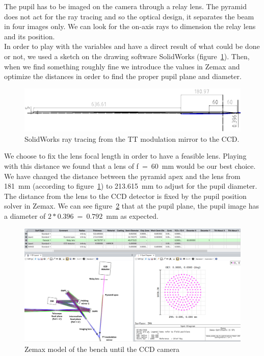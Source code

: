 \documentclass[12pt,a4paper]{article}
\begin{document}
The pupil has to be imaged on the camera through a relay lens. The pyramid does not act for the ray tracing and so the optical design, it separates the beam in four images only. We can look for the on-axis rays to dimension the relay lens and its position.\\
In order to play with the variables and have a direct result of what could be done or not, we used a sketch on the drawing software SolidWorks (figure~\ref{fig:SW_trace_rayons_TTMM_CCD}). Then, when we find something roughly fine we introduce the values in Zemax and optimize the distances in order to find the proper pupil plane and diameter.
\begin{figure}[H]
	\begin{center}
		\includegraphics[width=\textwidth]{images/SW_trace_rayons_TTMM_CCD.PNG}
		\caption{SolidWorks ray tracing from the TT modulation mirror to the CCD.}\label{fig:SW_trace_rayons_TTMM_CCD}
	\end{center}
\end{figure}
We choose to fix the lens focal length in order to have a feasible lens. Playing with this distance we found that a lens of f~=~60~mm would be our best choice. We have changed the distance between the pyramid apex and the lens from 181~mm (according to figure~\ref{fig:SW_trace_rayons_TTMM_CCD}) to 213.615~mm to adjust for the pupil diameter. The distance from the lens to the CCD detector is fixed by the pupil position solver in Zemax. We can see figure~\ref{fig:Zemax_model_FP_CCD} that at the pupil plane, the pupil image has a diameter of $2*0.396~=~0.792$~mm as expected.
\begin{figure}[H]
	\begin{center}
		\includegraphics[width=\textwidth]{images/Zemax_model_FP_CCD.PNG}
		\caption{Zemax model of the bench until the CCD camera}\label{fig:Zemax_model_FP_CCD}
	\end{center}
\end{figure}
\end{document}
